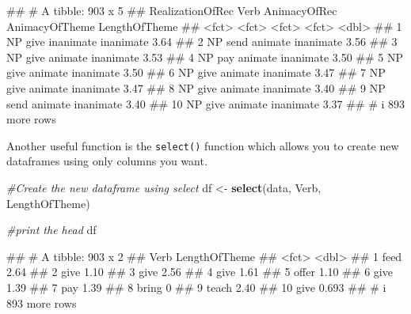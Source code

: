 \documentclass[
]{book}
\newenvironment{Shaded}{\begin{snugshade}}{\end{snugshade}}
\newcommand{\CommentTok}[1]{\textcolor[rgb]{0.56,0.35,0.01}{\textit{#1}}}
\newcommand{\FunctionTok}[1]{\textcolor[rgb]{0.13,0.29,0.53}{\textbf{#1}}}
\newcommand{\NormalTok}[1]{#1}
\newcommand{\OtherTok}[1]{\textcolor[rgb]{0.56,0.35,0.01}{#1}}
\begin{document}
\begin{Shaded}
\begin{Highlighting}[]
\NormalTok{\#\# \# A tibble: 903 x 5}
\NormalTok{\#\#    RealizationOfRec Verb  AnimacyOfRec AnimacyOfTheme LengthOfTheme}
\NormalTok{\#\#    \textless{}fct\textgreater{}            \textless{}fct\textgreater{} \textless{}fct\textgreater{}        \textless{}fct\textgreater{}                  \textless{}dbl\textgreater{}}
\NormalTok{\#\#  1 NP               give  inanimate    inanimate               3.64}
\NormalTok{\#\#  2 NP               send  animate      inanimate               3.56}
\NormalTok{\#\#  3 NP               give  animate      inanimate               3.53}
\NormalTok{\#\#  4 NP               pay   animate      inanimate               3.50}
\NormalTok{\#\#  5 NP               give  animate      inanimate               3.50}
\NormalTok{\#\#  6 NP               give  animate      inanimate               3.47}
\NormalTok{\#\#  7 NP               give  animate      inanimate               3.47}
\NormalTok{\#\#  8 NP               give  animate      inanimate               3.40}
\NormalTok{\#\#  9 NP               send  animate      inanimate               3.40}
\NormalTok{\#\# 10 NP               give  animate      inanimate               3.37}
\NormalTok{\#\# \# i 893 more rows}
\end{Highlighting}
\end{Shaded}

Another useful function is the \texttt{select()} function which allows you to create new dataframes using only columns you want.

\begin{Shaded}
\begin{Highlighting}[]
\CommentTok{\#Create the new dataframe using select}
\NormalTok{df }\OtherTok{\textless{}{-}} \FunctionTok{select}\NormalTok{(data, Verb, LengthOfTheme)}

\CommentTok{\#print the head}
\NormalTok{df}
\end{Highlighting}
\end{Shaded}

\begin{Shaded}
\begin{Highlighting}[]
\NormalTok{\#\# \# A tibble: 903 x 2}
\NormalTok{\#\#    Verb  LengthOfTheme}
\NormalTok{\#\#    \textless{}fct\textgreater{}         \textless{}dbl\textgreater{}}
\NormalTok{\#\#  1 feed          2.64 }
\NormalTok{\#\#  2 give          1.10 }
\NormalTok{\#\#  3 give          2.56 }
\NormalTok{\#\#  4 give          1.61 }
\NormalTok{\#\#  5 offer         1.10 }
\NormalTok{\#\#  6 give          1.39 }
\NormalTok{\#\#  7 pay           1.39 }
\NormalTok{\#\#  8 bring         0    }
\NormalTok{\#\#  9 teach         2.40 }
\NormalTok{\#\# 10 give          0.693}
\NormalTok{\#\# \# i 893 more rows}
\end{Highlighting}
\end{Shaded}
\end{document}
